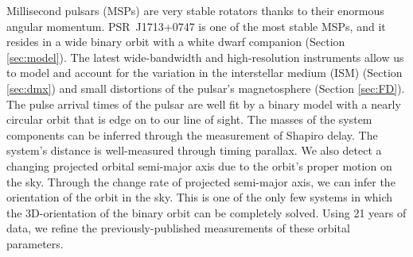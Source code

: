 Millisecond pulsars (MSPs) are very stable rotators thanks to their enormous angular momentum. PSR~J1713+0747 is one of the most stable MSPs, and it resides in a wide binary orbit with a white dwarf companion (Section \ref{sec:model}). 
The latest wide-bandwidth and high-resolution instruments allow us to model and account for the variation in the interstellar medium (ISM)
(Section \ref{sec:dmx}) and small distortions of the pulsar's magnetosphere (Section \ref{sec:FD}). 
The pulse arrival times of the pulsar are well fit by a binary model with
a nearly circular orbit that is edge on to our line of sight. The masses of
the system components can be inferred through the measurement of Shapiro delay. 
The system's distance is well-measured through timing parallax. We also detect
a changing projected orbital semi-major axis due to the orbit's proper motion
on the sky. Through the change rate of projected semi-major axis, we can infer 
the orientation of the orbit in the sky.
This is one of the only few systems in which the 3D-orientation of the
binary orbit can be completely solved. Using 21 years of data, we
refine the previously-published measurements of these orbital parameters.


